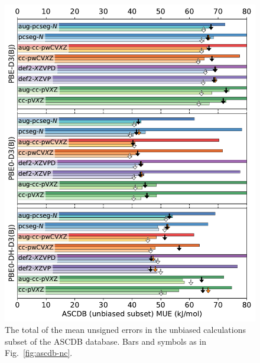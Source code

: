 \documentclass[12pt]{article}
\begin{document}
\begin{figure}[p]
    \centering
    \includegraphics[width=12cm]{../output/fig_ascdb_ub.pdf}
    \caption{The total of the mean unsigned errors in the unbiased calculations subset of the ASCDB database. Bars and symbols as in Fig.~\ref{fig:ascdb-nc}.}
\end{figure}
\end{document}
